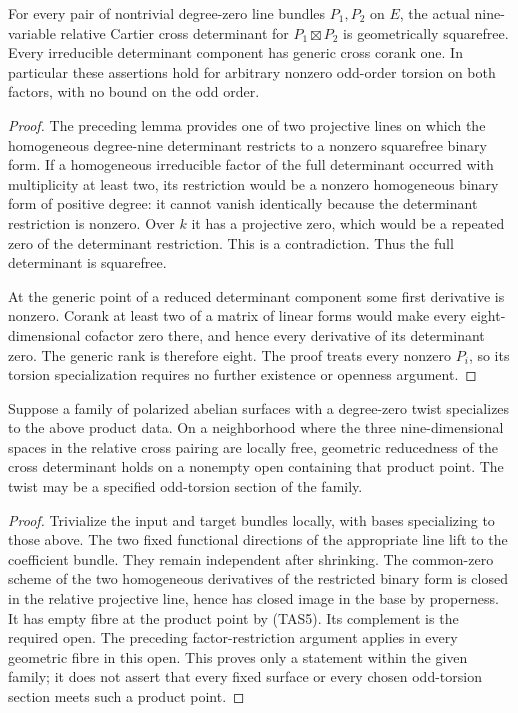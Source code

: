 \begin{theorem}
\label{thm:ss-product-two-axis-cross-squarefree}
For every pair of nontrivial degree-zero line bundles \(P_1,P_2\)
on \(E\), the actual nine-variable relative Cartier cross
determinant for \(P_1\boxtimes P_2\) is geometrically squarefree.
Every irreducible determinant component has generic cross corank one.
In particular these assertions hold for arbitrary nonzero odd-order
torsion on both factors, with no bound on the odd order.
\end{theorem}
\begin{proof}
The preceding lemma provides one of two projective lines on which
the homogeneous degree-nine determinant restricts to a nonzero
squarefree binary form. If a homogeneous irreducible factor of the
full determinant occurred with multiplicity at least two, its
restriction would be a nonzero homogeneous binary form of positive
degree: it cannot vanish identically because the determinant
restriction is nonzero. Over \(k\) it has a projective zero,
which would be a repeated zero of the determinant restriction.
This is a contradiction. Thus the full determinant is squarefree.

At the generic point of a reduced determinant component some first
derivative is nonzero. Corank at least two of a matrix of linear
forms would make every eight-dimensional cofactor zero there,
and hence every derivative of its determinant zero. The generic
rank is therefore eight. The proof treats every nonzero \(P_i\),
so its torsion specialization requires no further existence or
openness argument.
\end{proof}

\begin{corollary}
\label{cor:ss-product-two-axis-reduced-deformation-open}
Suppose a family of polarized abelian surfaces with a degree-zero
twist specializes to the above product data. On a neighborhood
where the three nine-dimensional spaces in the relative cross
pairing are locally free, geometric reducedness of the cross
determinant holds on a nonempty open containing that product point.
The twist may be a specified odd-torsion section of the family.
\end{corollary}
\begin{proof}
Trivialize the input and target bundles locally, with bases
specializing to those above. The two fixed functional directions
of the appropriate line lift to the coefficient bundle. They
remain independent after shrinking. The common-zero scheme of
the two homogeneous derivatives of the restricted binary form
is closed in the relative projective line, hence has closed image
in the base by properness. It has empty fibre at the product
point by (TAS5). Its complement is the required open.
The preceding factor-restriction argument applies in every
geometric fibre in this open. This proves only a statement within
the given family; it does not assert that every fixed surface
or every chosen odd-torsion section meets such a product point.
\end{proof}

